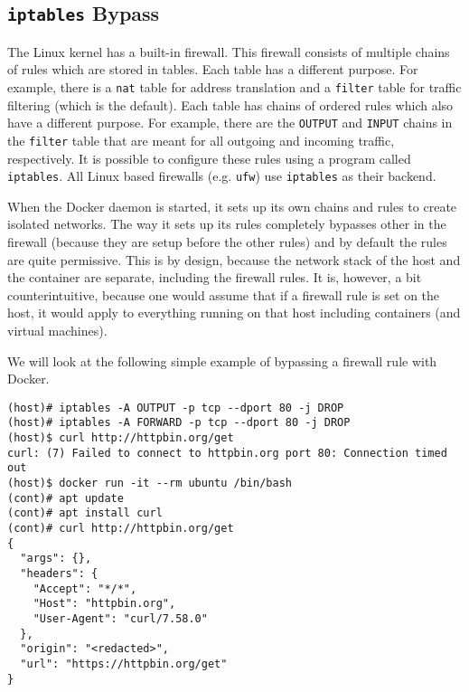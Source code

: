 \subsection{\texorpdfstring{\lstinline{iptables}}{iptables} Bypass}\label{subsection:iptables}
The Linux kernel has a built-in firewall. This firewall consists of multiple chains of rules which are stored in tables. Each table has a different purpose. For example, there is a \lstinline{nat} table for address translation and a \lstinline{filter} table for traffic filtering (which is the default).
Each table has chains of ordered rules which also have a different purpose. For example, there are the \lstinline{OUTPUT} and \lstinline{INPUT} chains in the \lstinline{filter} table that are meant for all outgoing and incoming traffic, respectively.
It is possible to configure these rules using a program called \lstinline{iptables}. All Linux based firewalls (e.g. \lstinline{ufw}) use \lstinline{iptables} as their backend.

\hfill

When the Docker daemon is started, it sets up its own chains and rules to create isolated networks. The way it sets up its rules completely bypasses other in the firewall (because they are setup before the other rules) and by default the rules are quite permissive. This is by design, because the network stack of the host and the container are separate, including the firewall rules. It is, however, a bit counterintuitive, because one would assume that if a firewall rule is set on the host, it would apply to everything running on that host including containers (and virtual machines).

\hfill

We will look at the following simple example of bypassing a firewall rule with Docker.

\begin{lstlisting}[caption={Bypass \lstinline{iptables} firewall rules using Docker.},captionpos=b]
(host)# iptables -A OUTPUT -p tcp --dport 80 -j DROP
(host)# iptables -A FORWARD -p tcp --dport 80 -j DROP
(host)$ curl http://httpbin.org/get
curl: (7) Failed to connect to httpbin.org port 80: Connection timed out
(host)$ docker run -it --rm ubuntu /bin/bash
(cont)# apt update
(cont)# apt install curl
(cont)# curl http://httpbin.org/get
{
  "args": {},
  "headers": {
    "Accept": "*/*",
    "Host": "httpbin.org",
    "User-Agent": "curl/7.58.0"
  },
  "origin": "<redacted>",
  "url": "https://httpbin.org/get"
}
\end{lstlisting}

